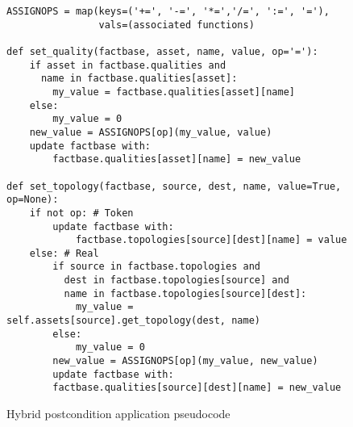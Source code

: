 \begin{figure}
\begin{lstlisting}
ASSIGNOPS = map(keys=('+=', '-=', '*=','/=', ':=', '='),
                vals=(associated functions)

def set_quality(factbase, asset, name, value, op='='):
    if asset in factbase.qualities and
      name in factbase.qualities[asset]:
        my_value = factbase.qualities[asset][name]
    else:
        my_value = 0
    new_value = ASSIGNOPS[op](my_value, value)
    update factbase with:
        factbase.qualities[asset][name] = new_value

def set_topology(factbase, source, dest, name, value=True, op=None):
    if not op: # Token
        update factbase with:
            factbase.topologies[source][dest][name] = value
    else: # Real
        if source in factbase.topologies and
          dest in factbase.topologies[source] and
          name in factbase.topologies[source][dest]:
            my_value = self.assets[source].get_topology(dest, name)
        else:
            my_value = 0
        new_value = ASSIGNOPS[op](my_value, new_value)
        update factbase with:
        factbase.qualities[source][dest][name] = new_value
\end{lstlisting}
\caption{Hybrid postcondition application pseudocode}
\label{fig:hybrid-postcondition}
\end{figure}
